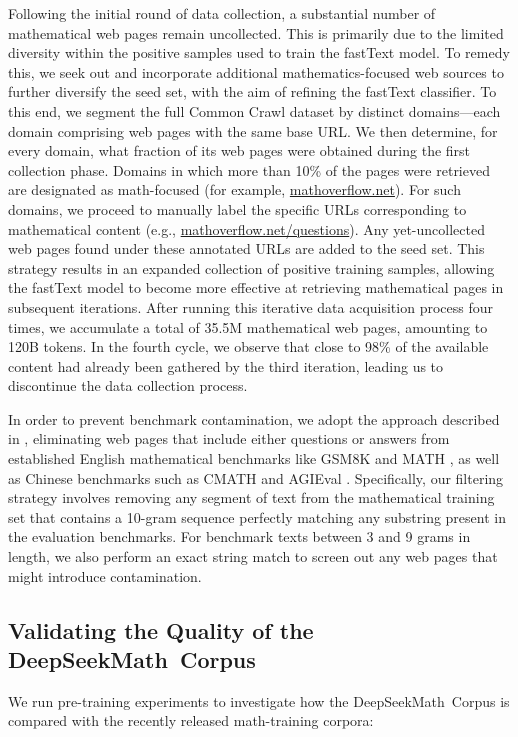 \begin{itemize}[topsep=0pt]
Following the initial round of data collection, a substantial number of mathematical web pages remain uncollected. This is primarily due to the limited diversity within the positive samples used to train the fastText model. To remedy this, we seek out and incorporate additional mathematics-focused web sources to further diversify the seed set, with the aim of refining the fastText classifier. To this end, we segment the full Common Crawl dataset by distinct domains—each domain comprising web pages with the same base URL. We then determine, for every domain, what fraction of its web pages were obtained during the first collection phase. Domains in which more than 10\% of the pages were retrieved are designated as math-focused (for example, \url{mathoverflow.net}). For such domains, we proceed to manually label the specific URLs corresponding to mathematical content (e.g., \url{mathoverflow.net/questions}). Any yet-uncollected web pages found under these annotated URLs are added to the seed set. This strategy results in an expanded collection of positive training samples, allowing the fastText model to become more effective at retrieving mathematical pages in subsequent iterations. After running this iterative data acquisition process four times, we accumulate a total of 35.5M mathematical web pages, amounting to 120B tokens. In the fourth cycle, we observe that close to 98\% of the available content had already been gathered by the third iteration, leading us to discontinue the data collection process.

In order to prevent benchmark contamination, we adopt the approach described in \cite{deepseek-coder}, eliminating web pages that include either questions or answers from established English mathematical benchmarks like GSM8K \citep{gsm8k} and MATH \citep{MATH}, as well as Chinese benchmarks such as CMATH \citep{wei2023cmath} and AGIEval \citep{agieval}. Specifically, our filtering strategy involves removing any segment of text from the mathematical training set that contains a 10-gram sequence perfectly matching any substring present in the evaluation benchmarks. For benchmark texts between 3 and 9 grams in length, we also perform an exact string match to screen out any web pages that might introduce contamination.

\subsection{Validating the Quality of the DeepSeekMath~Corpus}

We run pre-training experiments to investigate how the DeepSeekMath~Corpus is compared with the recently released math-training corpora:


\end{itemize}
